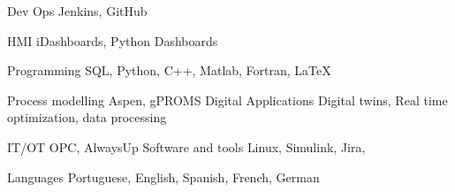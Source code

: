 

\begin{cvskills}

  \cvskill
    {Dev Ops} %
    {Jenkins, GitHub} %


  \cvskill
    {HMI} %
    {iDashboards, Python Dashboards} %

  \cvskill
    {Programming} %
    {SQL, Python, C++, Matlab, Fortran, LaTeX} %

  \cvskill
    {Process modelling} %
    {Aspen, gPROMS} %
  \cvskill
    {Digital Applications} %
    {Digital twins, Real time optimization, data processing} %

  \cvskill
    {IT/OT} %
    {OPC, AlwaysUp} %
  \cvskill
    {Software and tools} %
    {Linux, Simulink, Jira,} %


  \cvskill
    {Languages} %
    {Portuguese, English, Spanish, French, German} %

\end{cvskills}
